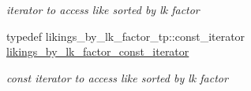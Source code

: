 \begin{DoxyCompactItemize}
\begin{DoxyCompactList}\small\item\em iterator to access like sorted by lk factor \end{DoxyCompactList}\item 
\hypertarget{structSpeciesInfo_a1e10640a53fd3c1524fcafcdfe3d1a10}{
typedef likings\_\-by\_\-lk\_\-factor\_\-tp::const\_\-iterator \hyperlink{structSpeciesInfo_a1e10640a53fd3c1524fcafcdfe3d1a10}{likings\_\-by\_\-lk\_\-factor\_\-const\_\-iterator}}
\label{structSpeciesInfo_a1e10640a53fd3c1524fcafcdfe3d1a10}

\begin{DoxyCompactList}\small\item\em const iterator to access like sorted by lk factor \end{DoxyCompactList}\end{DoxyCompactItemize}
